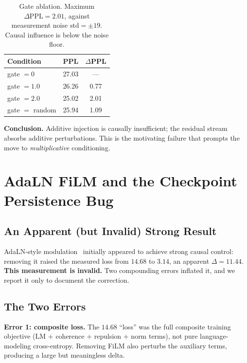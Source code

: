 \documentclass[11pt,a4paper]{article}
\begin{document}
\begin{table}[h]
\centering
\begin{tabular}{lcc}
\toprule
\textbf{Condition} & \textbf{PPL} & \textbf{$\Delta$PPL} \\
\midrule
gate $= 0$      & 27.03 & ---  \\
gate $= 1.0$    & 26.26 & 0.77 \\
gate $= 2.0$    & 25.02 & 2.01 \\
gate $=$ random & 25.94 & 1.09 \\
\bottomrule
\end{tabular}
\caption{Gate ablation. Maximum $\Delta\mathrm{PPL} = 2.01$, against measurement noise
$\mathrm{std} = \pm 19$. Causal influence is below the noise floor.}
\label{tab:gate}
\end{table}

\textbf{Conclusion.} Additive injection is causally insufficient; the residual stream
absorbs additive perturbations. This is the motivating failure that prompts the move to
\emph{multiplicative} conditioning.

\section{AdaLN FiLM and the Checkpoint Persistence Bug}
\label{sec:bug}

\subsection{An Apparent (but Invalid) Strong Result}

AdaLN-style modulation~\cite{perez2018film, peebles2023scalable} initially appeared to
achieve strong causal control: removing it raised the measured loss from $14.68$ to
$3.14$, an apparent $\Delta = 11.44$. \textbf{This measurement is invalid.} Two
compounding errors inflated it, and we report it only to document the correction.

\subsection{The Two Errors}

\textbf{Error 1: composite loss.} The $14.68$ ``loss'' was the full composite training
objective (LM $+$ coherence $+$ repulsion $+$ norm terms), not pure language-modeling
cross-entropy. Removing FiLM also perturbs the auxiliary terms, producing a large but
meaningless delta.
\end{document}

